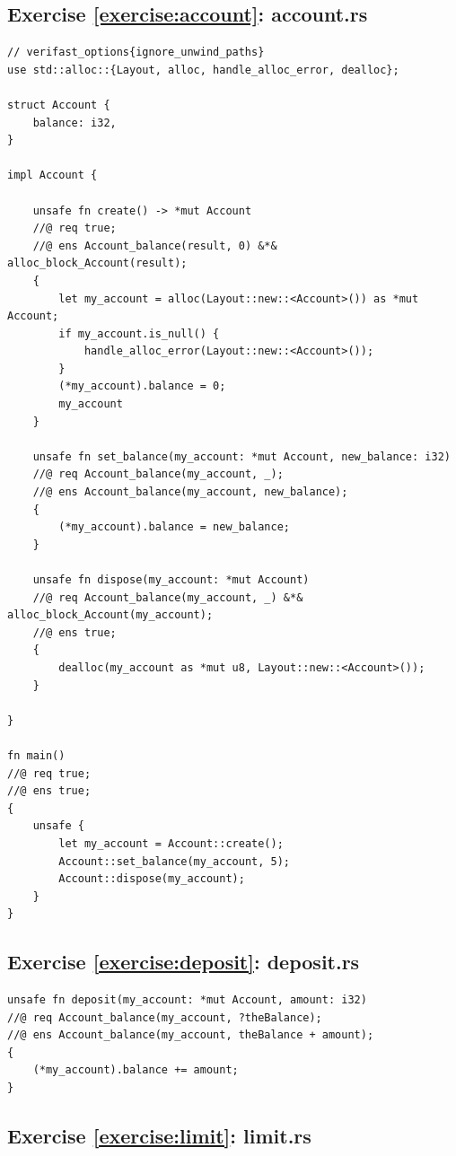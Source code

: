 \documentclass{article}
\begin{document}
\subsection{Exercise \ref{exercise:account}: account.rs}

\begin{lstlisting}
// verifast_options{ignore_unwind_paths}
use std::alloc::{Layout, alloc, handle_alloc_error, dealloc};

struct Account {
    balance: i32,
}

impl Account {

    unsafe fn create() -> *mut Account
    //@ req true;
    //@ ens Account_balance(result, 0) &*& alloc_block_Account(result);
    {
        let my_account = alloc(Layout::new::<Account>()) as *mut Account;
        if my_account.is_null() {
            handle_alloc_error(Layout::new::<Account>());
        }
        (*my_account).balance = 0;
        my_account
    }

    unsafe fn set_balance(my_account: *mut Account, new_balance: i32)
    //@ req Account_balance(my_account, _);
    //@ ens Account_balance(my_account, new_balance);
    {
        (*my_account).balance = new_balance;
    }

    unsafe fn dispose(my_account: *mut Account)
    //@ req Account_balance(my_account, _) &*& alloc_block_Account(my_account);
    //@ ens true;
    {
        dealloc(my_account as *mut u8, Layout::new::<Account>());
    }

}

fn main()
//@ req true;
//@ ens true;
{
    unsafe {
        let my_account = Account::create();
        Account::set_balance(my_account, 5);
        Account::dispose(my_account);
    }
}
\end{lstlisting}

\subsection{Exercise \ref{exercise:deposit}: deposit.rs}

\begin{lstlisting}
unsafe fn deposit(my_account: *mut Account, amount: i32)
//@ req Account_balance(my_account, ?theBalance);
//@ ens Account_balance(my_account, theBalance + amount);
{
    (*my_account).balance += amount;
}
\end{lstlisting}

\subsection{Exercise \ref{exercise:limit}: limit.rs}
\end{document}
